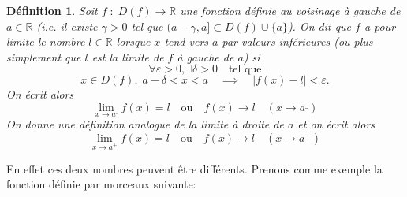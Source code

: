 \documentclass[a4paper, 12pt, french, twoside]{article}
\newtheorem{defi}[theorem]{Définition}
\newcommand{\Rr}{{\mathbb{R}}}
\begin{document}
\begin{defi}
    Soit $f\;:\;D(f)\longrightarrow\Rr$ une fonction définie au voisinage à gauche de $a\in\Rr$ (i.e. il existe $\gamma>0$ tel que $(a-\gamma,a]\subset D(f)\cup \{a\}$).
    On dit que $f$ a pour limite le nombre $l\in\Rr$ lorsque $x$ tend vers $a$ par valeurs inférieures (ou plus simplement que $l$ est la limite de $f$ à gauche de $a$) si \[
    \forall \varepsilon>0,\exists\delta>0 \quad\text{tel que}
    \]
    \[
    x\in D(f), \;a-\delta<x<a \quad \implies \quad |f(x)-l|<\varepsilon .
    \]
    On écrit alors\[
    \lim_{x\rightarrow a^{\_}}f(x)=l \quad \text{ou} \quad f(x)\longrightarrow l \quad (x\rightarrow a^{\_})
    \]
    On donne une définition analogue de la limite à droite de $a$ et on écrit alors \[
    \lim_{x\rightarrow a^+}f(x)=l \quad \text{ou} \quad f(x)\longrightarrow l \quad (x\rightarrow a^{+})
    \]
\end{defi}
En effet ces deux nombres peuvent être différents. Prenons comme exemple la fonction définie par morceaux suivante:
\end{document}
